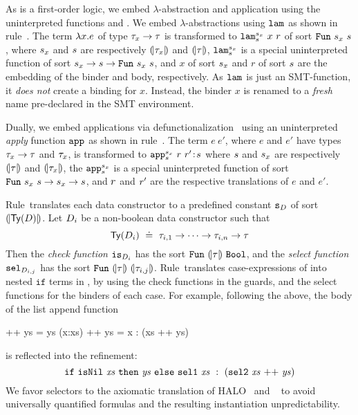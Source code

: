 %
As \smtlan is a first-order logic, we
embed $\lambda$-abstraction and application
using the uninterpreted functions
\smtlamname{}{} and \smtappname{}{}.
%
We embed $\lambda$-abstractions
using $\texttt{lam}^{}_{}$ as shown in rule~\lgfun.
%
The term $\lambda x. e$ of type
${\tau_x \rightarrow \tau}$ is transformed
to
${\smtlamname{\sort_x}{\sort}\ x\ \pred}$
of sort
${\mathtt{Fun}\ {s_x}\ {s}}$, where
%
$s_x$ and $s$ are respectively
$(\!|\tau_x|\!)$ and $(\!|\tau|\!)$,
%
${\texttt{lam}^{s_x}_{s}}$
is a special uninterpreted function
of sort
${s_x \rightarrow s\rightarrow\mathtt{Fun}\ {s_x}\ {s}}$,
and
$x$ of sort $s_x$ and $r$ of sort $s$ are
the embedding of the binder and body, respectively.
%
As $\texttt{lam}^{}_{}$ is just an SMT-function,
it \emph{does not} create a binding for $x$.
%
Instead, the binder $x$ is renamed to
a \emph{fresh} name pre-declared in
the SMT environment.


%
Dually, we embed applications via
defunctionalization~\citep{Reynolds72}
using an uninterpreted \emph{apply}
function
$\texttt{app}^{}_{}$ as shown in rule~\lgapp.
%
The term ${e\ e'}$, where $e$ and $e'$ have
types ${\tau_x \rightarrow \tau}$ and $\tau_x$,
is transformed to
${\tbind{\smtappname{\sort_x}{\sort}\ \pred\ \pred'}{\sort}}$
where
%
$s$ and $s_x$ are respectively $(\!|\tau|\!)$ and $(\!|\tau_x|\!)$,
the
${\texttt{app}^{s_x}_{s}}$
is a special uninterpreted function of sort
${\mathtt{Fun}\ {s_x}\ {s} \rightarrow s_x \rightarrow s}$,
and
$r$ and $r'$ are the respective translations of $e$ and $e'$.


%
Rule~\lgdc translates each data constructor to a
predefined \smtlan constant ${\texttt{s}_{D}}$ of
sort ${(\!|\mathsf{Ty}({D})|\!)}$.
%
Let $D_i$ be a non-boolean data constructor such that
$$
\mathsf{Ty}({D_i}) \ \doteq\  \tau_{i,1} \rightarrow \dots \rightarrow \tau_{i,n} \rightarrow \tau
$$
Then the \emph{check function}
${\texttt{is}_{{D_i}}}$ has the sort
$\mathtt{Fun}\ {(\!|\tau|\!)}\ {\texttt{Bool}}$,
and the \emph{select function}
${\texttt{sel}_{{D}_{i,j}}}$ has the sort
$\mathtt{Fun}\ {(\!|\tau|\!)}\ {(\!|\tau_{i,j}|\!)}$.
%
Rule~\lgcase translates case-expressions
of \corelan into nested $\mathtt{if}$
terms in \smtlan, by using the check
functions in the guards, and the
select functions for the binders
of each case.
%
%
%
For example, following the above, the body of the list append function
%
\begin{code}
  []     ++ ys = ys
  (x:xs) ++ ys = x : (xs ++ ys)
\end{code}
%
is reflected into the \smtlan refinement:
%
$$
\ite{\mathtt{isNil}\ \mathit{xs}}
    {\mathit{ys}}
    {\mathtt{sel1}\ \mathit{xs}\
       \dcons\
       (\mathtt{sel2}\ \mathit{xs} \ \mathtt{++}\  \mathit{ys})}
$$
%
We favor selectors to the axiomatic translation of
HALO~\citep{halo} and \fstar~\cite{fstar} to avoid
universally quantified formulas and the resulting
instantiation unpredictability.

